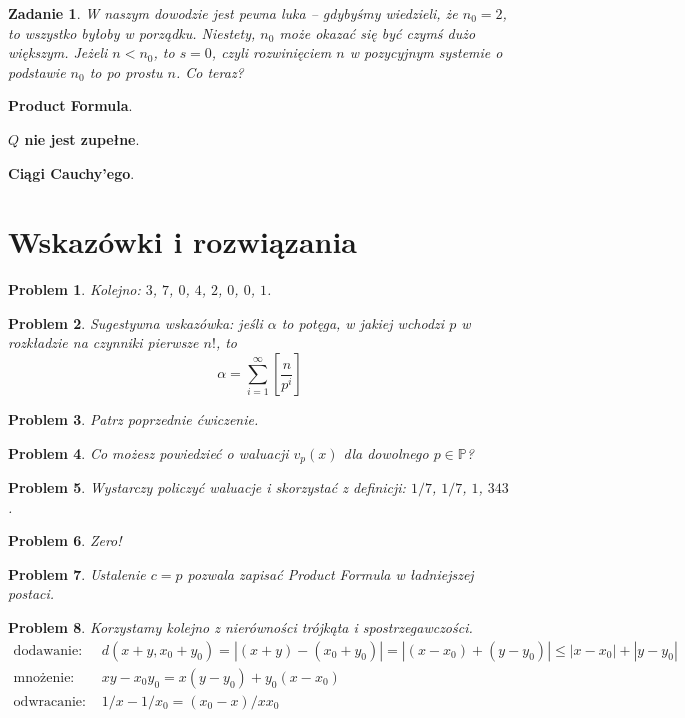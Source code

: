 \documentclass[a4paper,fleqn,9pt]{extarticle}
\newtheorem{prbh}{Zadanie}
\newtheorem{sol}{Problem}
\begin{document}
\begin{prbh}
W naszym dowodzie jest pewna luka -- gdybyśmy wiedzieli, że $n_0 = 2$, to wszystko byłoby w porządku.
Niestety, $n_0$ może okazać się być czymś dużo większym. Jeżeli $n < n_0$, to $s = 0$, czyli rozwinięciem $n$ w pozycyjnym systemie o podstawie $n_0$ to po prostu $n$.
Co teraz?
\end{prbh}

\textbf{Product Formula}.

\textbf{$Q$ nie jest zupełne}.

\textbf{Ciągi Cauchy'ego}.


\newpage
\section*{Wskazówki i rozwiązania}

\begin{sol}
Kolejno: $3$, $7$, $0$, $4$, $2$, $0$, $0$, $1$.
\end{sol}

\begin{sol}
Sugestywna wskazówka: jeśli $\alpha$ to potęga, w jakiej wchodzi $p$ w rozkładzie na czynniki pierwsze $n!$, to
\begin{equation*}
\alpha = \sum_{i=1}^{\infty} \left[\frac{n}{p^i}\right]
\end{equation*}
\end{sol}

\begin{sol}
Patrz poprzednie ćwiczenie.
\end{sol}

\begin{sol}
Co możesz powiedzieć o waluacji $v_p(x)$ dla dowolnego $p\in\mathbb P$?
\end{sol}

\begin{sol}
Wystarczy policzyć waluacje i skorzystać z definicji: $1/7$, $1/7$, $1$, $343$.
\end{sol}

\begin{sol}
Zero!
\end{sol}

\begin{sol}
Ustalenie $c=p$ pozwala zapisać Product Formula w ładniejszej postaci.
\end{sol}

\begin{sol} Korzystamy kolejno z  nierówności trójkąta i spostrzegawczości.
\begin{align*}
\text{dodawanie: } & d(x+y, x_0 + y_0) = |(x+y) -(x_0+y_0) | = |(x-x_0)+ (y-y_0)| \le |x-x_0| + |y-y_0|\\
\text{mnożenie: } & xy - x_0y_0 = x(y-y_0) + y_0(x-x_0)\\
\text{odwracanie: } & 1/x - 1/{x_0} = {(x_0-x)}/{xx_0}
\end{align*}
\end{sol}
\end{document}
